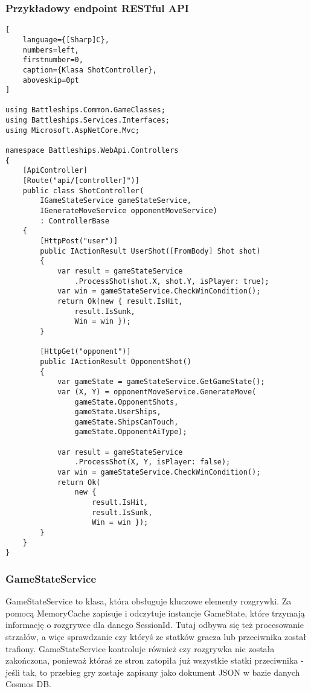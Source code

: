 \subsubsection{Przykładowy endpoint RESTful API}

\begin{addmargin}[0mm]{0mm}
\begin{lstlisting}[
    language={[Sharp]C},
    numbers=left,
    firstnumber=0,
    caption={Klasa ShotController},
    aboveskip=0pt
]

using Battleships.Common.GameClasses;
using Battleships.Services.Interfaces;
using Microsoft.AspNetCore.Mvc;

namespace Battleships.WebApi.Controllers
{
    [ApiController]
    [Route("api/[controller]")]
    public class ShotController(
        IGameStateService gameStateService,
        IGenerateMoveService opponentMoveService)
        : ControllerBase
    {
        [HttpPost("user")]
        public IActionResult UserShot([FromBody] Shot shot)
        {
            var result = gameStateService
                .ProcessShot(shot.X, shot.Y, isPlayer: true);
            var win = gameStateService.CheckWinCondition();
            return Ok(new { result.IsHit,
                result.IsSunk,
                Win = win });
        }

        [HttpGet("opponent")]
        public IActionResult OpponentShot()
        {
            var gameState = gameStateService.GetGameState();
            var (X, Y) = opponentMoveService.GenerateMove(
                gameState.OpponentShots,
                gameState.UserShips,
                gameState.ShipsCanTouch,
                gameState.OpponentAiType);

            var result = gameStateService
                .ProcessShot(X, Y, isPlayer: false);
            var win = gameStateService.CheckWinCondition();
            return Ok(
                new { 
                    result.IsHit,
                    result.IsSunk,
                    Win = win });
        }
    }
}

\end{lstlisting}
\end{addmargin}


\subsubsection{GameStateService}

GameStateService to klasa, która obsługuje kluczowe elementy rozgrywki. Za pomocą MemoryCache zapisuje i odczytuje instancje GameState, które trzymają informację o rozgrywce dla danego SessionId. Tutaj odbywa się też procesowanie strzałów, a więc sprawdzanie czy któryś ze statków gracza lub przeciwnika został trafiony. GameStateService kontroluje również czy rozgrywka nie została zakończona, ponieważ któraś ze stron zatopiła już wszystkie statki przeciwnika - jeśli tak, to przebieg gry zostaje zapisany jako dokument JSON w bazie danych Cosmos DB.

